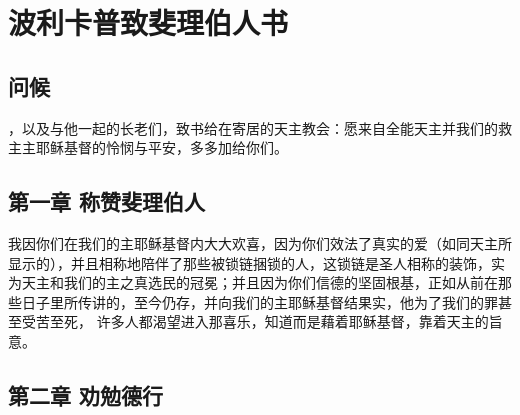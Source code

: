 
\chapter{波利卡普致斐理伯人书}



\section{问候}

，以及与他一起的长老们，致书给在寄居的天主教会：愿来自全能天主并我们的救主主耶稣基督的怜悯与平安，多多加给你们。\par


\section{第一章 称赞斐理伯人}

我因你们在我们的主耶稣基督内大大欢喜，因为你们效法了真实的爱（如同天主所显示的），并且相称地陪伴了那些被锁链捆锁的人，这锁链是圣人相称的装饰，实为天主和我们的主之真选民的冠冕；并且因为你们信德的坚固根基，正如从前在那些日子里所传讲的，至今仍存，并向我们的主耶稣基督结果实，他为了我们的罪甚至受苦至死， 许多人都渴望进入那喜乐，知道而是藉着耶稣基督，靠着天主的旨意。\par


\section{第二章 劝勉德行}

